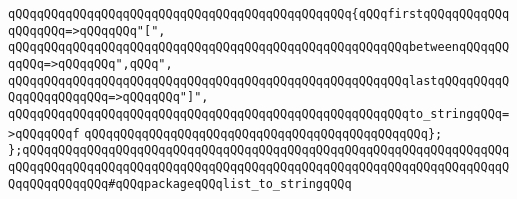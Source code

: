 \verb|qQQqqQQqqQQqqQQqqQQqqQQqqQQqqQQqqQQqqQQqqQQqqQQq{qQQqfirstqQQqqQQqqQQqqQQqqQQq=>qQQqqQQq"[",|\newline
\verb|qQQqqQQqqQQqqQQqqQQqqQQqqQQqqQQqqQQqqQQqqQQqqQQqqQQqqQQqbetweenqQQqqQQqqQQq=>qQQqqQQq",qQQq",|\newline
\verb|qQQqqQQqqQQqqQQqqQQqqQQqqQQqqQQqqQQqqQQqqQQqqQQqqQQqqQQqlastqQQqqQQqqQQqqQQqqQQqqQQq=>qQQqqQQq"]",|\newline
\verb|qQQqqQQqqQQqqQQqqQQqqQQqqQQqqQQqqQQqqQQqqQQqqQQqqQQqqQQqto_stringqQQq=>qQQqqQQqf|\newline
\verb|qQQqqQQqqQQqqQQqqQQqqQQqqQQqqQQqqQQqqQQqqQQqqQQq};|\newline
\newline
\newline
\verb|};qQQqqQQqqQQqqQQqqQQqqQQqqQQqqQQqqQQqqQQqqQQqqQQqqQQqqQQqqQQqqQQqqQQqqQQqqQQqqQQqqQQqqQQqqQQqqQQqqQQqqQQqqQQqqQQqqQQqqQQqqQQqqQQqqQQqqQQqqQQqqQQqqQQqqQQq#qQQqpackageqQQqlist_to_stringqQQq|\newline
\newline

